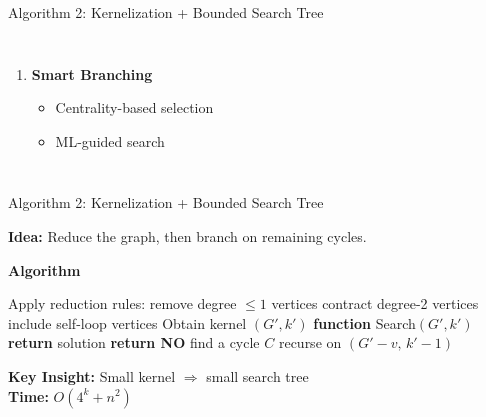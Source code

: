 \documentclass[aspectratio=169]{beamer}
\begin{document}
\begin{frame}{Algorithm 2: Kernelization + Bounded Search Tree}
\begin{columns}[T]
\begin{enumerate}
			\item \textbf{Smart Branching}
			      \begin{itemize}
				      \scriptsize
				      \item Centrality-based selection
				      \item ML-guided search
			      \end{itemize}
		\end{enumerate}

	\end{columns}
\end{frame}


\begin{frame}{Algorithm 2: Kernelization + Bounded Search Tree}

\scriptsize
\textbf{Idea:} Reduce the graph, then branch on remaining cycles.

\textbf{Algorithm}
\begin{algorithmic}[1]
  \State Apply reduction rules:
  \State \quad remove degree $\le 1$ vertices
  \State \quad contract degree-2 vertices
  \State \quad include self-loop vertices
  \State Obtain kernel $(G',k')$
  \State \textbf{function} Search$(G',k')$
    \State \textbf{return} solution
  \EndIf
    \State \textbf{return NO}
  \EndIf
  \State find a cycle $C$
    \State recurse on $(G' - v,\, k' - 1)$
  \EndFor
\end{algorithmic}

\textbf{Key Insight:} Small kernel $\Rightarrow$ small search tree \\
\textbf{Time:} $O(4^k + n^2)$
\end{frame}
\end{document}
